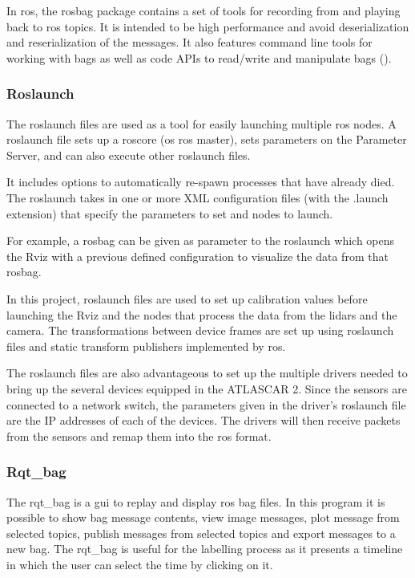 In \gls{ros}, the rosbag package contains a set of tools for recording from and playing back to \gls{ros} topics. It is intended to be high performance and avoid deserialization and reserialization of the messages. It also features command line tools for working with bags as well as code APIs to read/write and manipulate bags (\cite{ROSWikia}).

\subsubsection{Roslaunch}
The roslaunch files are used as a tool for easily launching multiple \gls{ros} nodes. A roslaunch file sets up a roscore (os \gls{ros} master), sets parameters on the Parameter Server, and can also execute other roslaunch files. 

It includes options to automatically re-spawn processes that have already died. The roslaunch takes in one or more XML configuration files (with the .launch extension) that specify the parameters to set and nodes to launch.

For example, a rosbag can be given as parameter to the roslaunch which opens the Rviz with a previous defined configuration to visualize the data from that rosbag.

In this project, roslaunch files are used to set up calibration values before launching the Rviz and the nodes that process the data from the \gls{lidar}s and the camera. The transformations between device frames are set up using roslaunch files and static transform publishers implemented by \gls{ros}. 

The roslaunch files are also advantageous to set up the multiple drivers needed to bring up the several devices equipped in the ATLASCAR 2. Since the sensors are connected to a network switch, the parameters given in the driver's roslaunch file are the IP addresses of each of the devices. The drivers will then receive packets from the sensors and remap them into the \gls{ros} format.

\subsubsection{Rqt\_bag}

The rqt\_bag is a \gls{gui} to replay and display \gls{ros} bag files. In this program it is possible to show bag message contents, view image messages, plot message from selected topics, publish messages from selected topics and export messages to a new bag. The rqt\_bag is useful for the labelling process as it presents a timeline in which the user can select the time by clicking on it.



